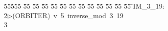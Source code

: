 %
%
\begin{tabbing}
55555 \= 55 \= 55 \= 55 \= 55 \= 55 \= 55 \= 55 \= 55 \= 55 \= 55 \= 55 \= 55 \= \>IM\_3\_19:\\[0pt]
2\>$\triangleright$\>(ORBITER)\ v\ 5\ inverse\_mod\ 3\ 19\\[0pt]
3\>\end{tabbing}
